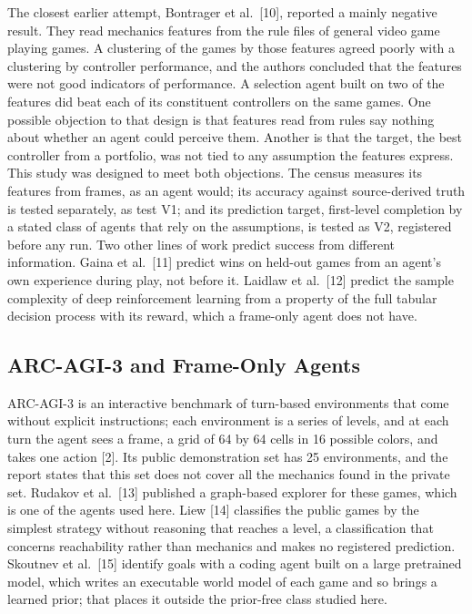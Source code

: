 \documentclass[journal]{IEEEtran}
\begin{document}
The closest earlier attempt, Bontrager et al.~{[}10{]}, reported a
mainly negative result. They read mechanics features from the rule files
of general video game playing games. A clustering of the games by those
features agreed poorly with a clustering by controller performance, and
the authors concluded that the features were not good indicators of
performance. A selection agent built on two of the features did beat
each of its constituent controllers on the same games. One possible
objection to that design is that features read from rules say nothing
about whether an agent could perceive them. Another is that the target,
the best controller from a portfolio, was not tied to any assumption the
features express. This study was designed to meet both objections. The
census measures its features from frames, as an agent would; its
accuracy against source-derived truth is tested separately, as test V1;
and its prediction target, first-level completion by a stated class of
agents that rely on the assumptions, is tested as V2, registered before
any run. Two other lines of work predict success from different
information. Gaina et al.~{[}11{]} predict wins on held-out games from
an agent's own experience during play, not before it. Laidlaw et
al.~{[}12{]} predict the sample complexity of deep reinforcement
learning from a property of the full tabular decision process with its
reward, which a frame-only agent does not have.

\subsection{ARC-AGI-3 and Frame-Only
Agents}\label{arc-agi-3-and-frame-only-agents}

ARC-AGI-3 is an interactive benchmark of turn-based environments that
come without explicit instructions; each environment is a series of
levels, and at each turn the agent sees a frame, a grid of 64 by 64
cells in 16 possible colors, and takes one action {[}2{]}. Its public
demonstration set has 25 environments, and the report states that this
set does not cover all the mechanics found in the private set. Rudakov
et al.~{[}13{]} published a graph-based explorer for these games, which
is one of the agents used here. Liew {[}14{]} classifies the public
games by the simplest strategy without reasoning that reaches a level, a
classification that concerns reachability rather than mechanics and
makes no registered prediction. Skoutnev et al.~{[}15{]} identify goals
with a coding agent built on a large pretrained model, which writes an
executable world model of each game and so brings a learned prior; that
places it outside the prior-free class studied here.
\end{document}
